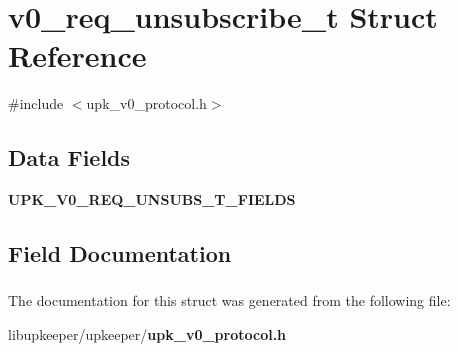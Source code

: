 \section{v0\_\-req\_\-unsubscribe\_\-t Struct Reference}
\label{structv0__req__unsubscribe__t}


{\ttfamily \#include $<$upk\_\-v0\_\-protocol.h$>$}

\subsection*{Data Fields}
\begin{DoxyCompactItemize}
\item 
{\bf UPK\_\-V0\_\-REQ\_\-UNSUBS\_\-T\_\-FIELDS}
\end{DoxyCompactItemize}


\subsection{Field Documentation}
\subsubsection[{UPK\_\-V0\_\-REQ\_\-UNSUBS\_\-T\_\-FIELDS}]{}\label{structv0__req__unsubscribe__t_a3ef7d23a7d85581c997ebf550b345572}


The documentation for this struct was generated from the following file:\begin{DoxyCompactItemize}
\item 
libupkeeper/upkeeper/{\bf upk\_\-v0\_\-protocol.h}\end{DoxyCompactItemize}
